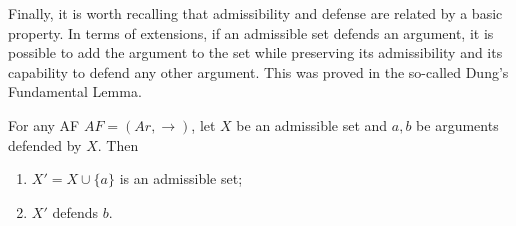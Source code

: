Finally, 
it is worth recalling that admissibility and defense are related by a basic property. 
In terms of extensions, 
if an admissible set defends an argument, 
it is possible to add the argument to the set while preserving its admissibility and its capability to defend any other argument. 
This was proved in the so-called Dung's Fundamental Lemma.


\begin{lemma}
    For any AF $AF=(Ar,\to)$, 
    let $X$ be an admissible set and $a,b$ be arguments defended by $X$. 
    Then 
    \begin{enumerate}[itemsep=5pt,parsep=5pt,leftmargin=3em,topsep=5pt,label=(\arabic*)] %
        \item $X'=X\cup\{a\}$ is an admissible set; 
        \item $X'$ defends $b$.
    \end{enumerate}   
\end{lemma}










